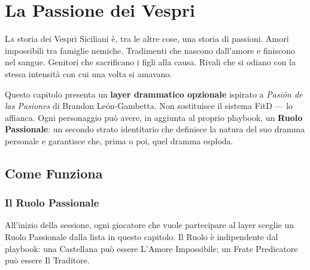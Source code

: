 
\chapter{La Passione dei Vespri}

\lettrine[lines=3]{L}{a} storia dei Vespri Siciliani è, tra le altre cose,
una storia di passioni. Amori impossibili tra famiglie nemiche. Tradimenti
che nascono dall'amore e finiscono nel sangue. Genitori che sacrificano
i figli alla causa. Rivali che si odiano con la stessa intensità con cui
una volta si amavano.

Questo capitolo presenta un \textbf{layer drammatico opzionale} ispirato
a \textit{Pasión de las Pasiones} di Brandon León-Gambetta. Non sostituisce
il sistema FitD — lo affianca. Ogni personaggio può avere, in aggiunta
al proprio playbook, un \textbf{Ruolo Passionale}: un secondo strato
identitario che definisce la natura del suo dramma personale e garantisce
che, prima o poi, quel dramma esploda.


\secsep

\section{Come Funziona}

\subsection{Il Ruolo Passionale}

All'inizio della sessione, ogni giocatore che vuole partecipare al layer
sceglie un Ruolo Passionale dalla lista in questo capitolo. Il Ruolo è
indipendente dal playbook: una Castellana può essere L'Amore Impossibile;
un Frate Predicatore può essere Il Traditore.

